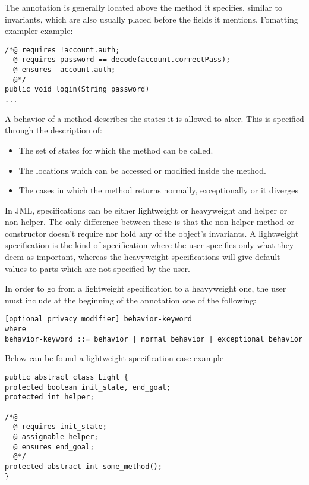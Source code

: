 \documentclass{article}
\begin{document}
The annotation is generally located above the method it specifies, similar to invariants, which are also usually placed before the fields it mentions.
Fomatting exampler example:\\
\begin{lstlisting}
/*@ requires !account.auth;
  @ requires password == decode(account.correctPass);
  @ ensures  account.auth;
  @*/
public void login(String password)
...
\end{lstlisting}

 
A behavior of a method describes the states it is allowed to alter.  This is specified through the description of: \pagebreak

\begin{itemize}
    \item The set of states for which the method can be called.
    \item The locations which can be accessed or modified inside the method.
    \item The cases in which the method returns normally, exceptionally or it diverges
\end{itemize}

In JML, specifications can be either lightweight or heavyweight and helper or non-helper. The only difference between these is that the non-helper method or constructor doesn't require nor hold any of the object's invariants. A lightweight specification is the kind of specification where the user specifies only what they deem as important, whereas the heavyweight specifications will give default values to parts which are not specified by the user.

In order to go from a lightweight specification to a heavyweight one, the user must include at the beginning of the annotation one of the following:\\
\begin{lstlisting}[columns=fixed, basewidth=0.5em, basicstyle={\ttfamily}]
[optional privacy modifier] behavior-keyword
where
behavior-keyword ::= behavior | normal_behavior | exceptional_behavior
\end{lstlisting}

\begin{center}
    Below can be found a lightweight specification case example
\end{center}

\begin{lstlisting}[columns=fixed, basewidth=0.5em, basicstyle={\ttfamily}]
public abstract class Light {
protected boolean init_state, end_goal;
protected int helper;

/*@
  @	requires init_state;
  @	assignable helper;
  @	ensures end_goal;
  @*/
protected abstract int some_method();
}
\end{lstlisting}
\end{document}
